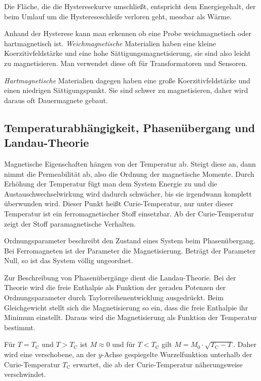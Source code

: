\documentclass[12pt,a4paper]{scrartcl}
\numberwithin{equation}{section} %
\renewcommand{\[}{} %
\renewcommand{\]}{\noindent} %
\begin{document}
Die Fläche, die die Hysteresekurve umschließt, entspricht dem Energiegehalt, der beim Umlauf um die Hystereseschleife verloren geht, messbar als Wärme.

Anhand der Hysterese kann man erkennen ob eine Probe weichmagnetisch oder hartmagnetisch ist. \emph{Weichmagnetische} Materialien haben eine kleine Koerzitivfeldstärke und eine hohe Sättigungsmagnetisierung, sie sind also leicht zu magnetisieren. Man verwendet diese oft für Transformatoren und Sensoren.

\emph{Hartmagnetische} Materialien dagegen haben eine große Koerzitivfeldstärke und einen niedrigen Sättigungspunkt. Sie sind schwer zu magnetisieren, daher wird daraus oft Dauermagnete gebaut.

\hypertarget{temperaturabhuxe4ngigkeit-phasenuxfcbergang-und-landau-theorie}{%
\subsection{Temperaturabhängigkeit, Phasenübergang und Landau-Theorie}\label{temperaturabhuxe4ngigkeit-phasenuxfcbergang-und-landau-theorie}}
Magnetische Eigenschaften hängen von der Temperatur ab. Steigt diese an, dann nimmt die Permeabilität ab, also die Ordnung der magnetische Momente. Durch Erhöhung der Temperatur fügt man dem System Energie zu und die Austauschwechselwirkung wird dadurch schwächer, bis sie irgendwann komplett überwunden wird. Dieser Punkt heißt Curie-Temperatur, nur unter dieser Temperatur ist ein ferromagnetischer Stoff einsetzbar. Ab der Curie-Temperatur zeigt der Stoff paramagnetische Verhalten.

Ordnungsparameter beschreibt den Zustand eines System beim Phasenübergang. Bei Ferromagneten ist der Parameter die Magnetisierung. Beträgt der Parameter Null, so ist das System völlig ungeordnet.

Zur Beschreibung von Phasenübergänge dient die Landau-Theorie. Bei der Theorie wird die freie Enthalpie als Funktion der geraden Potenzen der Ordnungsparameter durch Taylorreihenentwicklung ausgedrückt. Beim Gleichgewicht stellt sich die Magnetisierung so ein, dass die freie Enthalpie ihr Minimum einstellt. Daraus wird die Magnetisierung als Funktion der Temperatur bestimmt.

Für \(T=T_\mathrm{C}\) und \(T > T_\mathrm{C}\) ist \(M\approx 0\) und für \(T < T_\mathrm{C}\) gilt \(M = M_0 \cdot \sqrt{T_\mathrm{C} - T}\). Daher wird eine verschobene, an der \(y\)-Achse gespiegelte Wurzelfunktion unterhalb der Curie-Temperatur \(T_\mathrm{C}\) erwartet, die ab der Curie-Temperatur näherungsweise verschwindet.
\end{document}
